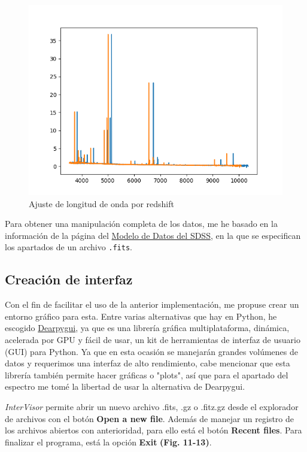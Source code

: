 \documentclass[9pt,twocolumn,a4paper]{opticajnl}
\begin{document}
\begin{figure}
    \centering
    \includegraphics[width=1\linewidth]{redshift_ajuste.png}
    \caption{Ajuste de longitud de onda por redshift}
    \label{fig:redshift_ajuste}
\end{figure}

Para obtener una manipulación completa de los datos, me he basado en la información de la página del \href{https://data.sdss.org/datamodel/files/MANGA_SPECTRO_DATA/MJD5/sdR.html}{Modelo de Datos del SDSS}, en la que se especifican los apartados de un archivo \verb|.fits|.

\subsection*{Creación de interfaz}
Con el fin de facilitar el uso de la anterior implementación, me propuse crear un entorno gráfico para esta. Entre varias alternativas que hay en Python, he escogido \href{https://dearpygui.readthedocs.io/en/latest/}{Dearpygui}, ya que es una librería gráfica multiplataforma, dinámica, acelerada por GPU y fácil de usar, un kit de herramientas de interfaz de usuario (GUI) para Python. Ya que en esta ocasión se manejarán grandes volúmenes de datos y requerimos una interfaz de alto rendimiento, cabe mencionar que esta librería también permite hacer gráficas o "plots", así que para el apartado del espectro me tomé la libertad de usar la alternativa de Dearpygui.

\textit{InterVisor} permite abrir un nuevo archivo .fits, .gz o .fitz.gz desde el explorador de archivos con el botón \textbf{Open a new file}. Además de manejar un registro de los archivos abiertos con anterioridad, para ello está el botón \textbf{Recent files}. Para finalizar el programa, está la opción \textbf{Exit} \textbf{(Fig. 11-13)}.
\end{document}
